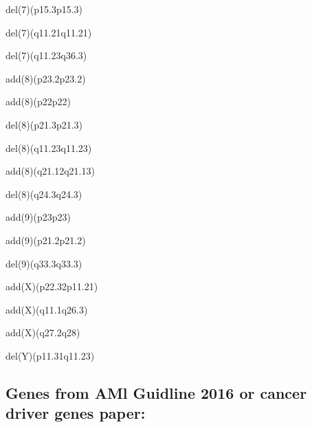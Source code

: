 \documentclass[]{article}
\begin{document}
del(7)(p15.3p15.3)

del(7)(q11.21q11.21)

del(7)(q11.23q36.3)

add(8)(p23.2p23.2)

add(8)(p22p22)

del(8)(p21.3p21.3)

del(8)(q11.23q11.23)

add(8)(q21.12q21.13)

del(8)(q24.3q24.3)

add(9)(p23p23)

add(9)(p21.2p21.2)

del(9)(q33.3q33.3)

add(X)(p22.32p11.21)

add(X)(q11.1q26.3)

add(X)(q27.2q28)

del(Y)(p11.31q11.23)

\hypertarget{genes-from-aml-guidline-2016-or-cancer-driver-genes-paper}{%
\subsection{Genes from AMl Guidline 2016 or cancer driver genes
paper:}\label{genes-from-aml-guidline-2016-or-cancer-driver-genes-paper}}
\end{document}
